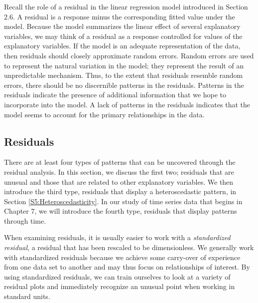 Recall the role of a residual in the linear regression model
introduced in Section 2.6. A residual is a response minus the
corresponding fitted value under the model. Because the model
summarizes the linear effect of several explanatory variables, we
may think of a residual as a response controlled for values of the
explanatory variables. If the model is an adequate representation of
the data, then residuals should closely approximate random errors.
Random errors are used to represent the natural variation in the
model; they represent the result of an unpredictable mechanism.
Thus, to the extent that residuals resemble random errors, there
should be no discernible patterns in the residuals. Patterns in the
residuals indicate the presence of additional information that we
hope to incorporate into the model. A lack of patterns in the
residuals indicates that the model seems to account for the primary
relationships in the data.


\subsection{Residuals}\label{S5:Residuals}

There are at least four types of patterns that can be uncovered
through the residual analysis. In this section, we discuss the first
two; residuals that are unusual and those that are related to other
explanatory variables. We then introduce the third type, residuals
that display a heteroscedastic pattern, in Section
\ref{S5:Heteroscedasticity}. In our study of time series data that
begins in Chapter 7, we will introduce the fourth type, residuals
that display patterns through
time.

When examining residuals, it is usually easier to work with a
\textit{standardized residual}, a residual that has been rescaled to
be dimensionless. We generally work with standardized residuals
because we achieve some carry-over of experience from one data set
to another and may thus focus on relationships of interest. By using
standardized residuals, we can train ourselves to look at a variety
of residual plots and immediately recognize an unusual point when
working in standard units.

